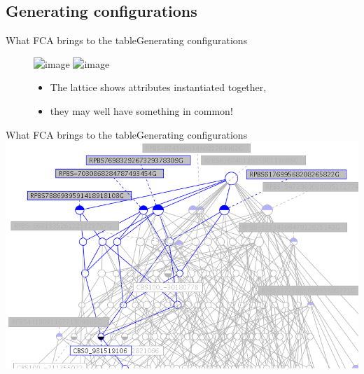 \subsection{Generating configurations}
\begin{frame}{What FCA brings to the table}{Generating configurations}

\begin{figure}[ht]
  \begin{minipage}[t]{0.45\linewidth}
    \vspace{0pt}
    \centering
    \includegraphics<1-1>[width=\textwidth]{img/fca/ressemble1}	
    \includegraphics<2-2>[width=\textwidth]{img/fca/ressemble2}		
  \end{minipage}
  \hfill
  \begin{minipage}[t]{0.52\linewidth}
    \vspace{0pt}
  \begin{itemize}
    \item The lattice shows attributes instantiated together,
    \item<2> they may well have something in common!
  \end{itemize}
  \end{minipage}
\end{figure}
\end{frame}

\begin{frame}{What FCA brings to the table}{Generating configurations}
  \centering
  \includegraphics[width=\textwidth]{img/fca/lattice_generating}
\end{frame}
